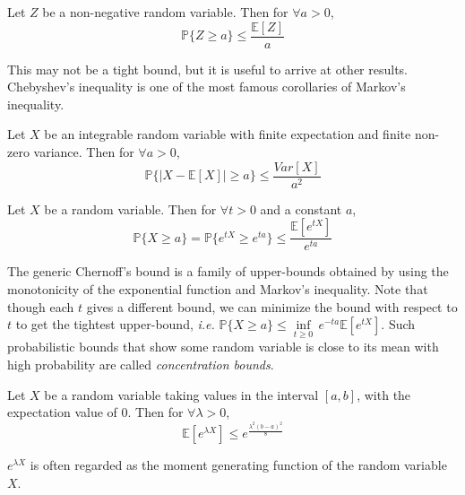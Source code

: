 \documentclass{article}
\begin{document}
\begin{lemma}
Let $Z$ be a non-negative random variable. Then for $\forall a > 0$,
$$\mathbb{P}\{Z \geq a\} \leq \frac{\mathbb{E}[Z]}{a}$$
\end{lemma}

This may not be a tight bound, but it is useful to arrive at other results. Chebyshev's inequality is one of the most famous corollaries of Markov's inequality.

\begin{lemma}
Let $X$ be an integrable random variable with finite expectation and finite non-zero variance. Then for $\forall a > 0$,
$$\mathbb{P}\{|X - \mathbb{E}[X]| \geq a\} \leq \frac{Var[X]}{a^2}$$
\end{lemma}

\begin{lemma}
Let $X$ be a random variable. Then for $\forall t > 0$ and a constant $a$,
$$\mathbb{P}\{X \geq a\} = \mathbb{P}\{e^{tX} \geq e^{ta}\} \leq \frac{\mathbb{E}[e^{tX}]}{e^{ta}}$$
\end{lemma}
The generic Chernoff's bound is a family of upper-bounds obtained by using the monotonicity of the exponential function and Markov's inequality. Note that though each $t$ gives a different bound, we can minimize the bound with respect to $t$ to get the tightest upper-bound, \textit{i.e.} $\mathbb{P}\{X \geq a\} \leq  \underset{t  \geq 0}{\inf}\,  e^{-ta} \mathbb{E}[e^{tX}] $. Such probabilistic bounds that show some random variable is close to its mean with high probability are called \emph{concentration bounds}.

\begin{lemma}
Let $X$ be a random variable taking values in the interval $[a, b]$, with the expectation value of $0$. Then for $\forall \lambda > 0$,
$$\mathbb{E}[e^{\lambda X}] \leq e^{\frac{\lambda^2 (b - a)^2}{8}}$$
\end{lemma}
$e^{\lambda X}$ is often regarded as the moment generating function of the random variable $X$.
\end{document}
